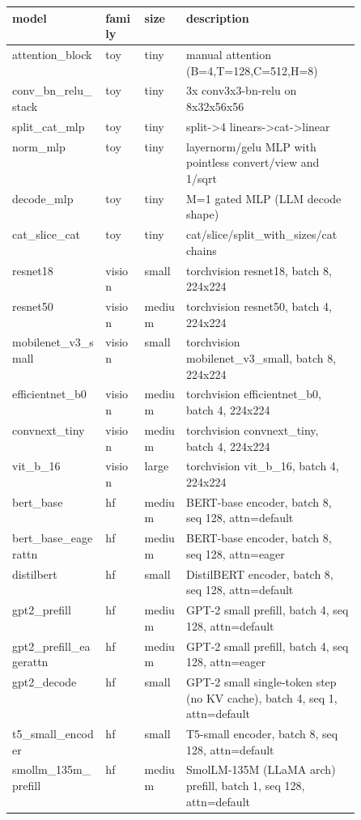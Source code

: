 \begin{table}[h]\centering\scriptsize
\begin{tabular}{lllp{0.5\linewidth}}\toprule
model & family & size & description \\\midrule
attention\_block & toy & tiny & manual attention (B=4,T=128,C=512,H=8) \\
conv\_bn\_relu\_stack & toy & tiny & 3x conv3x3-bn-relu on 8x32x56x56 \\
split\_cat\_mlp & toy & tiny & split->4 linears->cat->linear \\
norm\_mlp & toy & tiny & layernorm/gelu MLP with pointless convert/view and 1/sqrt \\
decode\_mlp & toy & tiny & M=1 gated MLP (LLM decode shape) \\
cat\_slice\_cat & toy & tiny & cat/slice/split\_with\_sizes/cat chains \\
resnet18 & vision & small & torchvision resnet18, batch 8, 224x224 \\
resnet50 & vision & medium & torchvision resnet50, batch 4, 224x224 \\
mobilenet\_v3\_small & vision & small & torchvision mobilenet\_v3\_small, batch 8, 224x224 \\
efficientnet\_b0 & vision & medium & torchvision efficientnet\_b0, batch 4, 224x224 \\
convnext\_tiny & vision & medium & torchvision convnext\_tiny, batch 4, 224x224 \\
vit\_b\_16 & vision & large & torchvision vit\_b\_16, batch 4, 224x224 \\
bert\_base & hf & medium & BERT-base encoder, batch 8, seq 128, attn=default \\
bert\_base\_eagerattn & hf & medium & BERT-base encoder, batch 8, seq 128, attn=eager \\
distilbert & hf & small & DistilBERT encoder, batch 8, seq 128, attn=default \\
gpt2\_prefill & hf & medium & GPT-2 small prefill, batch 4, seq 128, attn=default \\
gpt2\_prefill\_eagerattn & hf & medium & GPT-2 small prefill, batch 4, seq 128, attn=eager \\
gpt2\_decode & hf & small & GPT-2 small single-token step (no KV cache), batch 4, seq 1, attn=default \\
t5\_small\_encoder & hf & small & T5-small encoder, batch 8, seq 128, attn=default \\
smollm\_135m\_prefill & hf & medium & SmolLM-135M (LLaMA arch) prefill, batch 1, seq 128, attn=default \\

\end{tabular}
\end{table}

